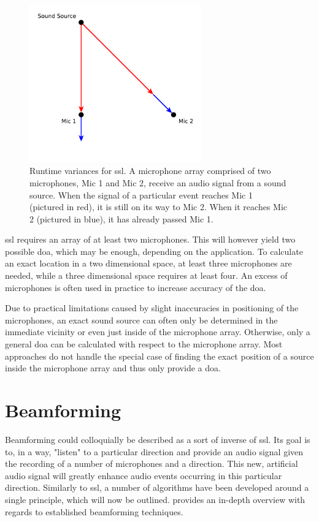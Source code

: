 \begin{figure}[]
	\centering
	\includegraphics[width=0.66\textwidth]{diagrams/basics_ssl.pdf}
	\caption{Runtime variances for \gls{ssl}.
		A microphone array comprised of two microphones, Mic 1 and Mic 2, receive an audio signal from a sound source.
		When the signal of a particular event reaches Mic 1 (pictured in red), it is still on its way to Mic 2.
		When it reaches Mic 2 (pictured in blue), it has already passed Mic 1.}
	\label{pic:basics:ssl}
\end{figure}

\gls{ssl} requires an array of at least two microphones.
This will however yield two possible \gls{doa}, which may be enough, depending on the application.
To calculate an exact location in a two dimensional space, at least three microphones are needed, while a three dimensional space requires at least four.
An excess of microphones is often used in practice to increase accuracy of the \gls{doa}.

Due to practical limitations caused by slight inaccuracies in positioning of the microphones, an exact sound source can often only be determined in the immediate vicinity or even just inside of the microphone array.
Otherwise, only a general \gls{doa} can be calculated with respect to the microphone array.
Most approaches do not handle the special case of finding the exact position of a source inside the microphone array and thus only provide a \gls{doa}.


\section{Beamforming}
Beamforming \cite{beamforming2017} could colloquially be described as a sort of inverse of \gls{ssl}.
Its goal is to, in a way, "listen" to a particular direction and provide an audio signal given the recording of a number of microphones and a direction.
This new, artificial audio signal will greatly enhance audio events occurring in this particular direction.
Similarly to \gls{ssl}, a number of algorithms have been developed around a single principle, which will now be outlined.
\cite{1239145} provides an in-depth overview with regards to established beamforming techniques.

